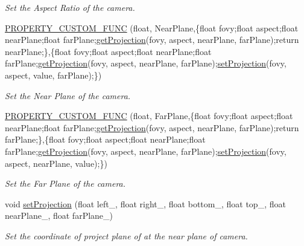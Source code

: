 \begin{DoxyCompactItemize}
\begin{DoxyCompactList}\small\item\em Set the Aspect Ratio of the camera. \end{DoxyCompactList}\item 
\hyperlink{class_perspective_camera_component_a04097ec06a9e418dbcb4ba936e2a4e93}{P\+R\+O\+P\+E\+R\+T\+Y\+\_\+\+C\+U\+S\+T\+O\+M\+\_\+\+F\+U\+NC} (float, Near\+Plane,\{float fovy;float aspect;float near\+Plane;float far\+Plane;\hyperlink{class_perspective_camera_component_ae3ce00b7bbf1c9e9e073f28793dd1645}{get\+Projection}(fovy, aspect, near\+Plane, far\+Plane);return near\+Plane;\},\{float fovy;float aspect;float near\+Plane;float far\+Plane;\hyperlink{class_perspective_camera_component_ae3ce00b7bbf1c9e9e073f28793dd1645}{get\+Projection}(fovy, aspect, near\+Plane, far\+Plane);\hyperlink{class_perspective_camera_component_a6b49a13999f7fb6593ca845c10579795}{set\+Projection}(fovy, aspect, value, far\+Plane);\})
\begin{DoxyCompactList}\small\item\em Set the Near Plane of the camera. \end{DoxyCompactList}\item 
\hyperlink{class_perspective_camera_component_ac6a21361eb17ad4ef49fd6aaad8c498e}{P\+R\+O\+P\+E\+R\+T\+Y\+\_\+\+C\+U\+S\+T\+O\+M\+\_\+\+F\+U\+NC} (float, Far\+Plane,\{float fovy;float aspect;float near\+Plane;float far\+Plane;\hyperlink{class_perspective_camera_component_ae3ce00b7bbf1c9e9e073f28793dd1645}{get\+Projection}(fovy, aspect, near\+Plane, far\+Plane);return far\+Plane;\},\{float fovy;float aspect;float near\+Plane;float far\+Plane;\hyperlink{class_perspective_camera_component_ae3ce00b7bbf1c9e9e073f28793dd1645}{get\+Projection}(fovy, aspect, near\+Plane, far\+Plane);\hyperlink{class_perspective_camera_component_a6b49a13999f7fb6593ca845c10579795}{set\+Projection}(fovy, aspect, near\+Plane, value);\})
\begin{DoxyCompactList}\small\item\em Set the Far Plane of the camera. \end{DoxyCompactList}\item 
void \hyperlink{class_perspective_camera_component_a6b49a13999f7fb6593ca845c10579795}{set\+Projection} (float left\+\_\+, float right\+\_\+, float bottom\+\_\+, float top\+\_\+, float near\+Plane\+\_\+, float far\+Plane\+\_\+)
\begin{DoxyCompactList}\small\item\em Set the coordinate of project plane of at the near plane of camera. \end{DoxyCompactList}\item 

\end{DoxyCompactItemize}
